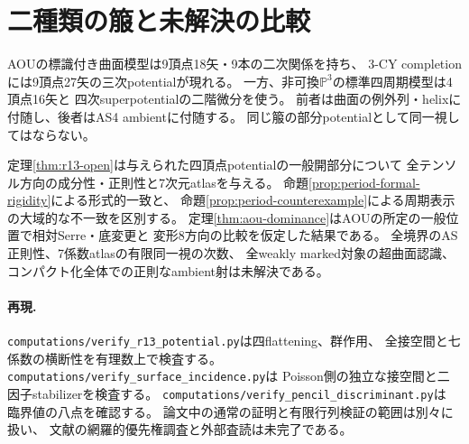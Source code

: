 \documentclass[11pt,a4paper]{ltjsarticle}
\theoremstyle{definition}\newtheorem{remark}[theorem]{注意}
\newcommand{\PP}{\mathbb P}\newcommand{\kk}{\mathbb C}
\begin{document}
\section{二種類の箙と未解決の比較}
AOUの標識付き曲面模型は9頂点18矢・9本の二次関係を持ち、
3-CY completionには9頂点27矢の三次potentialが現れる。
一方、非可換$\PP^3$の標準四周期模型は4頂点16矢と
四次superpotentialの二階微分を使う。
前者は曲面の例外列・helixに付随し、後者はAS4 ambientに付随する。
同じ箙の部分potentialとして同一視してはならない。

定理\ref{thm:r13-open}は与えられた四頂点potentialの一般開部分について
全テンソル方向の成分性・正則性と7次元atlasを与える。
命題\ref{prop:period-formal-rigidity}による形式的一致と、
命題\ref{prop:period-counterexample}による周期表示の大域的な不一致を区別する。
定理\ref{thm:aou-dominance}はAOUの所定の一般位置で相対Serre・底変更と
変形8方向の比較を仮定した結果である。
全境界のAS正則性、7係数atlasの有限同一視の次数、
全weakly marked対象の超曲面認識、コンパクト化全体での正則なambient射は未解決である。

\paragraph{再現.}
\texttt{computations/verify\_r13\_potential.py}は四flattening、群作用、
全接空間と七係数の横断性を有理数上で検査する。
\texttt{computations/verify\_surface\_incidence.py}は
Poisson側の独立な接空間と二因子stabilizerを検査する。
\texttt{computations/verify\_pencil\_discriminant.py}は
臨界値の八点を確認する。
論文中の通常の証明と有限行列検証の範囲は別々に扱い、
文献の網羅的優先権調査と外部査読は未完了である。
\end{document}
